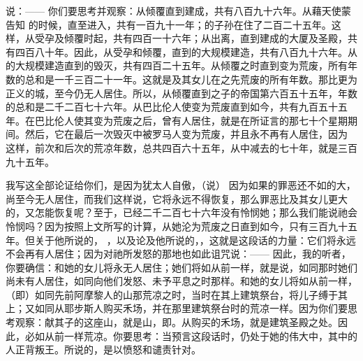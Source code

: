 说：——  你们要思考并观察：从倾覆直到建成，共有八百九十六年。从藉天使蒙告知 的时候，直至进入，共有一百九十一年；的子孙在住了二百二十五年。这样，从受孕及倾覆时起，共有四百一十六年；从出离，直到建成的大厦及圣殿，共有四百八十年。因此，从受孕和倾覆，直到的大规模建造，共有八百九十六年。从的大规模建造直到的毁灭，共有四百二十五年。从倾覆之时直到变为荒废，所有年数的总和是一千三百二十一年。这就是及其女儿在之先荒废的所有年数。那比更为正义的城，至今仍无人居住。所以，从倾覆直到之子的帝国第六百五十五年，年数的总和是二千二百七十六年。从巴比伦人使变为荒废直到如今，共有九百五十五年。在巴比伦人使其变为荒废之后，曾有人居住，就是在所证言的那七十个星期期间。然后，它在最后一次毁灭中被罗马人变为荒废，并且永不再有人居住，因为  这样，前次和后次的荒凉年数，总共四百六十五年，从中减去的七十年，就是三百九十五年。\par

我写这全部论证给你们，是因为犹太人自傲，（说） 因为如果的罪恶还不如的大，尚至今无人居住，而我们这样说，它将永远不得恢复，那么罪恶比及其女儿更大的，又怎能恢复呢？至于，已经二千二百七十六年没有怜悯她；那么我们能说祂会怜悯吗？因为按照上文所写的计算，从她沦为荒废之日直到如今，只有三百九十五年。但关于他所说的， ，以及论及他所说的，，这就是这段话的力量：它们将永远不会再有人居住；因为对祂所发怒的那地也如此诅咒说：——  因此，我的听者，你要确信：和她的女儿将永无人居住；她们将如从前一样，就是说，如同那时她们尚未有人居住，如同向他们发怒、未予平息之时那样。和她的女儿将如从前一样，（即）如同先前阿摩黎人的山那荒凉之时，当时在其上建筑祭台，将儿子缚于其上；又如同从耶步斯人购买禾场，并在那里建筑祭台时的荒凉一样。因为你们要思考观察：献其子的这座山，就是山，即。从购买的禾场，就是建筑圣殿之处。因此，必如从前一样荒凉。你要思考：当预言这段话时，仍处于她的伟大中，其中的人正背叛王。所说的，是以愤怒和谴责针对。\par

